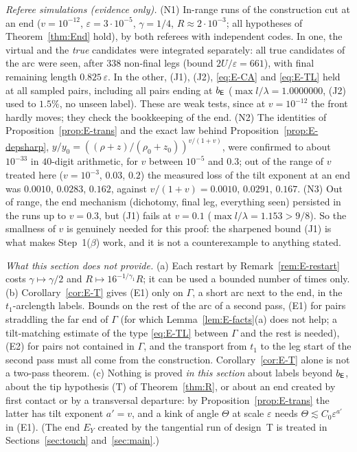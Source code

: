 \begin{remark}[Status]
\emph{Referee simulations (evidence only).}
(N1) In-range runs of the construction cut at an end ($v=10^{-12}$, $\varepsilon=3\cdot10^{-5}$, $\gamma=1/4$,
$R\approx2\cdot10^{-3}$; all hypotheses of Theorem~\ref{thm:End} hold), by both referees with independent codes. In one, the virtual
and the \emph{true} candidates were integrated separately: all true candidates of the arc were seen, after $338$ non-final legs
(bound $2U/\varepsilon=661$), with final remaining length $0.825\,\varepsilon$. In the other, (J1), (J2), \eqref{eq:E-CA} and
\eqref{eq:E-TL} held at all sampled pairs, including all pairs ending at $b_{\mathsf E}$ ($\max l/\lambda=1.0000000$, (J2) used to $1.5\%$,
no unseen label). These are weak tests, since at $v=10^{-12}$ the front hardly moves; they check the bookkeeping of the end.
(N2) The identities of Proposition~\ref{prop:E-trans} and the exact law behind Proposition~\ref{prop:E-depsharp},
$y/y_0=((\rho+z)/(\rho_0+z_0))^{v/(1+v)}$, were confirmed to about $10^{-33}$ in $40$-digit arithmetic, for $v$ between $10^{-5}$ and
$0.3$; out of the range of $v$ treated here ($v=10^{-3}$, $0.03$, $0.2$) the measured loss of the tilt exponent at an end
was $0.0010$, $0.0283$, $0.162$, against $v/(1+v)=0.0010$, $0.0291$, $0.167$.
(N3) Out of range, the end mechanism (dichotomy, final leg, everything seen) persisted in the runs up to $v=0.3$, but (J1) fails
at $v=0.1$ ($\max l/\lambda=1.153>9/8$). So the smallness of $v$ is genuinely needed for this proof: the sharpened bound (J1) is what
makes Step~1($\beta$) work, and it is not a counterexample to anything stated.

\emph{What this section does not provide.}
(a) Each restart by Remark~\ref{rem:E-restart} costs $\gamma\mapsto\gamma/2$ and $R\mapsto16^{-1/\gamma_1}R$; it can be used a
bounded number of times only.
(b) Corollary~\ref{cor:E-T} gives \textup{(E1)} only on $\Gamma$, a short arc next to the end, in the $t_1$-arclength labels.
Bounds on the rest of the arc of a second pass, \textup{(E1)} for pairs straddling the far end of $\Gamma$ (for which
Lemma~\ref{lem:E-facts}(a) does not help; a tilt-matching estimate of the type \eqref{eq:E-TL} between $\Gamma$ and the rest is
needed), \textup{(E2)} for pairs not contained in $\Gamma$, and the transport from $t_1$ to the leg start of the second pass must all
come from the construction. Corollary~\ref{cor:E-T} alone is not a two-pass theorem.
(c) Nothing is proved \emph{in this section} about labels beyond $b_{\mathsf E}$, about the tip hypothesis \textup{(T)} of Theorem~\ref{thm:R}, or about an end
created by first contact or by a transversal departure: by Proposition~\ref{prop:E-trans} the latter has tilt exponent $a'=v$, and
a kink of angle $\Theta$ at scale $\varepsilon$ needs $\Theta\lesssim C_0\varepsilon^{a'}$ in \textup{(E1)}.
(The end $E_Y$ created by the tangential run of design~T is treated in Sections~\ref{sec:touch} and~\ref{sec:main}.)


\end{remark}
